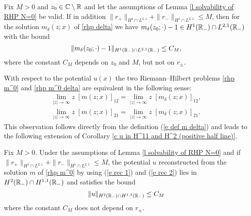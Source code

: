 \begin{lem}\label{l m(z0)-1 in in H^1 and L^2,1 (delta)}
   Fix $M>0$ and $z_0\in\mathbb C\setminus\mathbb R$ and let the assumptions of Lemma \ref{l solvability of RHP N=0} be valid. If in addition $\|r_+\|_{H^1\cap L^{2,1}}+\|r_-\|_{H^1\cap L^{2,1}}\leq M$, then for the solution $m_{\delta}(z;x)$ of \rh \ref{rhp delta} we have $m_{\delta}(z_0;\cdot)-1\in H^1(\mathbb R_-)\cap L^{2,1}(\mathbb R_-)$ with the bound
   \begin{equation*}%
       \|m_{\delta}(z_0;\cdot)-1\|_{H^1(\Real_-)\cap L^{2,1}(\Real_-)}\leq C_{M},
   \end{equation*}
   where the constant $C_M$ depends on $z_0$ and $M$, but not on $r_{\pm}$.
\end{lem}
With respect to the potential $u(x)$ the two Riemann--Hilbert problems \ref{rhp m^0} and \ref{rhp m^0 delta} are equivalent in the following sense:
\begin{equation}\label{e equivalent rhps}
    \begin{aligned}
        \lim_{|z|\to\infty}z\;[m(z;x)]_{12}= \lim_{|z|\to\infty}z\;[m_{\delta}(z;x)]_{12},\\
        \lim_{|z|\to\infty}z\;[m(z;x)]_{21}= \lim_{|z|\to\infty}z\;[m_{\delta}(z;x)]_{21}.
    \end{aligned}
\end{equation}
This observation follows directly from the definition (\ref{e def m delta}) and leads to the following extension of Corollary \ref{c u in H^11 and H^2 (positive half line)}.
\begin{cor}\label{c u in H^11 and H^2 (negative half line)}
   Fix $M>0$. Under the assumptions of Lemma \ref{l solvability of RHP N=0} and if $\|r_+\|_{H^1\cap L^{2,1}}+\|r_-\|_{H^1\cap L^{2,1}}\leq M$, the potential $u$ reconstructed from the solution $m$ of \rh \ref{rhp m^0} by using (\ref{e rec 1}) and (\ref{e rec 2}) lies in $H^2(\mathbb R_-)\cap H^{1,1}(\mathbb R_-)$ and satisfies the bound
   \begin{equation}\label{e u in H^11 and H^2 (negative half line)}
       \|u\|_{H^2(\mathbb R_-)\cap H^{1,1}(\mathbb R_-)}\leq C_M
   \end{equation}
   where the constant $C_M$ does not depend on $r_{\pm}$.
\end{cor}

